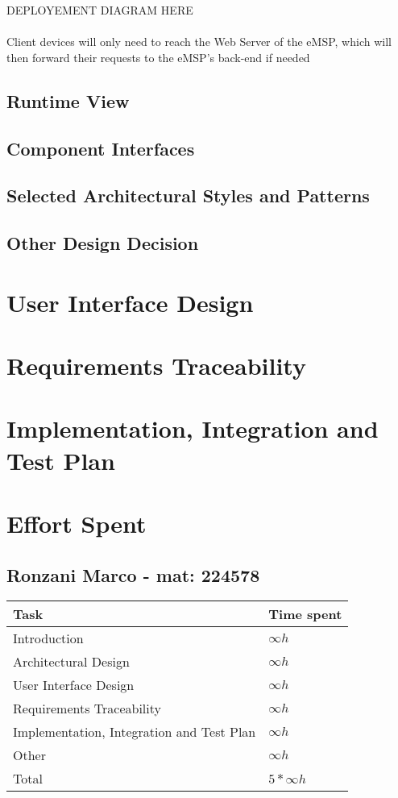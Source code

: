 \documentclass[11pt]{article}
\begin{document}
DEPLOYEMENT DIAGRAM HERE \\
\\
Client devices will only need to reach the Web Server of the eMSP, which will then forward their requests to the eMSP's back-end if needed

\subsection{Runtime View}

\subsection{Component Interfaces}

\subsection{Selected Architectural Styles and Patterns}

\subsection{Other Design Decision}

\section{User Interface Design}

\section{Requirements Traceability}

\section{Implementation, Integration and Test Plan}


\section{Effort Spent}

\subsection{Ronzani Marco - mat: 224578}

\begin{tabular}{|l|l|}
    \hline
    \textbf{Task} & \textbf{Time spent} \\
    \hline
    Introduction & $\infty h$ \\
    \hline
    Architectural Design & $\infty h$ \\
    \hline
    User Interface Design & $\infty h$ \\
    \hline
    Requirements Traceability & $\infty h$ \\
    \hline
    Implementation, Integration and Test Plan & $\infty h$ \\
    \hline
    Other & $\infty h$ \\
    \hline
    \hline
    Total & $5*\infty h$ \\
    \hline
\end{tabular}
\end{document}
